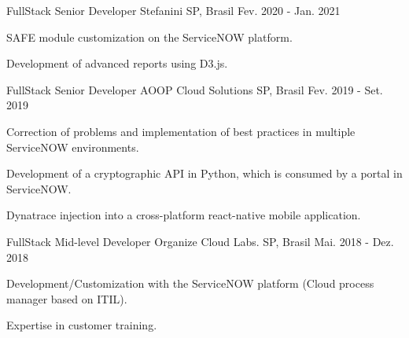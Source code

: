 \begin{cventries}
     \cventry
    {FullStack Senior Developer} %
    {Stefanini} %
    {SP, Brasil} %
    {Fev. 2020 - Jan. 2021} %
    {
    	\begin{cvitems} %
    		\item {SAFE module customization on the ServiceNOW platform.}
    		\item {Development of advanced reports using D3.js.}    		
    	\end{cvitems}
    }
    \cventry
    {FullStack Senior Developer} %
    {AOOP Cloud Solutions} %
    {SP, Brasil} %
    {Fev. 2019 - Set. 2019} %
    {
      \begin{cvitems} %
        \item {Correction of problems and implementation of best practices in multiple ServiceNOW environments.}
        \item {Development of a cryptographic API in Python, which is consumed by a portal in ServiceNOW.}
        \item {Dynatrace injection into a cross-platform react-native mobile application.}
      \end{cvitems}
    }   
	\cventry
	{FullStack Mid-level Developer} %
	{Organize Cloud Labs.} %
	{SP, Brasil} %
	{Mai. 2018 - Dez. 2018} %
	{
		\begin{cvitems} %
			\item {Development/Customization with the ServiceNOW platform (Cloud process manager based on ITIL).}
			\item {Expertise in customer training.}
		\end{cvitems}
	}

\end{cventries}

